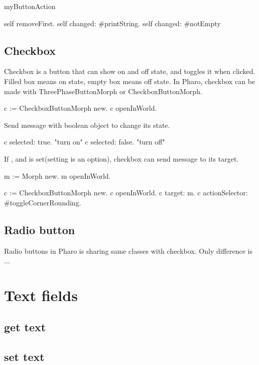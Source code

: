 \documentclass[a4paper,10pt,twoside]{book}
\begin{document}
\begin{code}{}
myButtonAction

	self removeFirst.
	self changed: #printString.
	self changed: #notEmpty
\end{code}




\subsection{Checkbox}
Checkbox is a button that can show on and off state, and toggles it when clicked. Filled box means on state, empty box means off state. In Pharo, checkbox can be made with ThreePhaseButtonMorph or CheckboxButtonMorph.

\begin{code}{}
c := CheckboxButtonMorph new.
c openInWorld.
\end{code}

Send  message with boolean object to change its state.

\begin{code}{}
c selected: true.  "turn on"
c selected: false. "turn off"
\end{code}

If , and  is set(setting  is an option), checkbox can send message to its target.

\begin{code}{}
m := Morph new.
m openInWorld.

c :=  CheckboxButtonMorph new.
c openInWorld.
c target: m.
c actionSelector: #toggleCornerRounding.  
\end{code}



\subsection{Radio button}

Radio buttons in Pharo is sharing same classes with checkbox. Only difference is ...

\section{Text fields}
\subsection{get text}
\subsection{set text}
\end{document}

